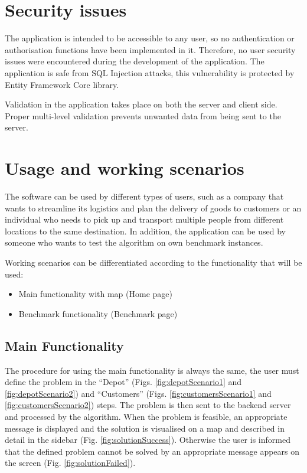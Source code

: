 \documentclass[a4paper,twoside,12pt]{book}
\begin{document}
\section{Security issues}
The application is intended to be accessible to any user, so no authentication or authorisation functions have been implemented in it. Therefore, no user security issues were encountered during the development of the application. The application is safe from SQL Injection attacks, this vulnerability is protected by Entity Framework Core library.

Validation in the application takes place on both the server and client side. Proper multi-level validation prevents unwanted data from being sent to the server.

\section{Usage and working scenarios}
The software can be used by different types of users, such as a company that wants to streamline its logistics and plan the delivery of goods to customers or an individual who needs to pick up and transport multiple people from different locations to the same destination. In addition, the application can be used by someone who wants to test the algorithm on own benchmark instances.

Working scenarios can be differentiated according to the functionality that will be used:

\begin{itemize}
    \item Main functionality with map (Home page)
    \item Benchmark functionality (Benchmark page)
\end{itemize}

\subsection{Main Functionality}
The procedure for using the main functionality is always the same, the user must define the problem in the ``Depot'' (Figs. \ref{fig:depotScenario1} and \ref{fig:depotScenario2}) and ``Customers'' (Figs. \ref{fig:customersScenario1} and \ref{fig:customersScenario2}) steps. The problem is then sent to the backend server and processed by the algorithm. When the problem is feasible, an appropriate message is displayed and the solution is visualised on a map and described in detail in the sidebar (Fig. \ref{fig:solutionSuccess}). Otherwise the user is informed that the defined problem cannot be solved by an appropriate message appears on the screen (Fig. \ref{fig:solutionFailed}). 
\end{document}
